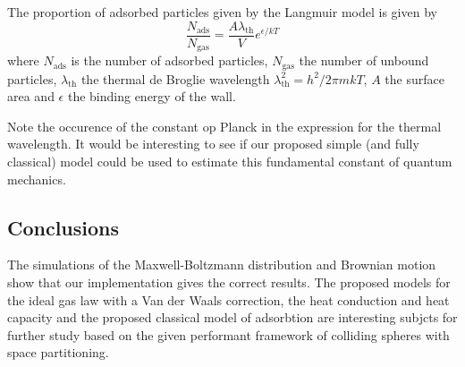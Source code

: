 The proportion of adsorbed particles given by the Langmuir model is given 
by\cite{adsorptionModel}
$$
\frac{N_\mathrm{ads}}{N_\mathrm{gas}} =
\frac{A \lambda_\mathrm{th}}{V}e^{\epsilon/kT}
$$
where $N_\mathrm{ads}$ is the number of adsorbed particles, $N_\mathrm{gas} 
$ the number of unbound particles, $\lambda_{\textrm{th}}$ the thermal de 
Broglie wavelength $\lambda_{\mathrm{th}}^2 = h^2 / 2 \pi m k T$, $A$ the 
surface area and $\epsilon$ the binding energy of the wall.

Note the occurence of the constant op Planck in the expression for the 
thermal wavelength. It would be interesting to see if our proposed simple 
(and fully classical) model could be used to estimate this fundamental 
constant of quantum mechanics.


\subsection{Conclusions}
The simulations of the Maxwell-Boltzmann distribution and Brownian motion 
show that our implementation gives the correct results. The proposed models
for the ideal gas law with a Van der Waals correction, the heat conduction 
and heat capacity and the proposed classical model of adsorbtion are 
interesting subjcts for further study based on the given performant 
framework of colliding spheres with space partitioning.


